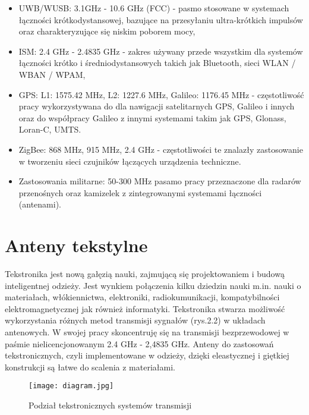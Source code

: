 \begin{itemize}\setlength{\itemsep}{0pt}
	
	\item UWB/WUSB: 3.1GHz - 10.6 GHz (FCC) - pasmo stosowane w systemach łączności krótkodystansowej, bazujące na przesyłaniu ultra-krótkich impulsów oraz charakteryzujące się niskim poborem mocy,

	\item ISM: 2.4 GHz - 2.4835 GHz - zakres używany przede wszystkim dla systemów łączności krótko i średniodystansowych takich jak Bluetooth, sieci WLAN / WBAN / WPAM,

	\item GPS: L1: 1575.42 MHz, L2: 1227.6 MHz, Galileo: 1176.45 MHz - częstotliwość pracy wykorzystywana do dla nawigacji satelitarnych GPS, Galileo i innych oraz do współpracy Galileo z innymi systemami takim jak GPS, Glonass, Loran-C, UMTS.

	\item ZigBee: 868 MHz, 915 MHz, 2.4 GHz - częstotliwości te znalazły zastosowanie w tworzeniu sieci czujników łączących urządzenia techniczne.

	\item Zastosowania militarne: 50-300 MHz pasamo pracy przeznaczone dla radarów przenośnych oraz kamizelek z zintegrowanymi systemami łączności (antenami).

\end{itemize}

\section{Anteny tekstylne}

Tekstronika jest nową gałęzią nauki, zajmującą się projektowaniem i budową inteligentnej odzieży. Jest wynkiem połączenia kilku dziedzin nauki m.in. nauki o materiałach, włókiennictwa, elektroniki, radiokumunikacji, kompatybilności elektromagnetycznej jak również informatyki. Tekstronika stwarza możliwość wykorzystania różnych metod transmisji sygnałów (rys.2.2) w układach antenowych. W swojej pracy skoncentruję się na transmisji bezprzewodowej w paśmie nielicencjonowanym 2.4 GHz - 2,4835 GHz.  
Anteny do zastosowań tekstronicznych, czyli implementowane w odzieży, dzięki eleastycznej i giętkiej konstrukcji są łatwe do scalenia z materiałami.


\begin{figure}[h!]
	\centering
	    \texttt{[image: diagram.jpg]}
	    \caption{Podział tekstronicznych systemów transmisji}
\end{figure}



